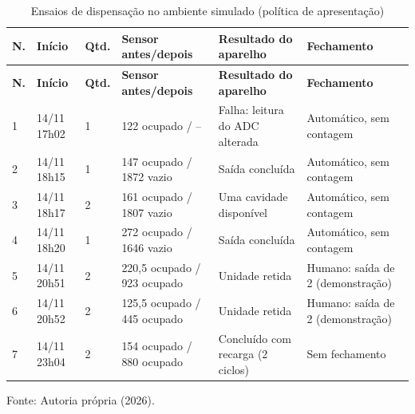 {\small\setlength{\tabcolsep}{3pt}\begin{longtable}{p{}p{}p{}p{}p{}p{}}
\caption{Ensaios de dispensação no ambiente simulado (política de apresentação)}\label{tab:ensaios-simulado}\\
\hline
\textbf{N.} & \textbf{Início} & \textbf{Qtd.} & \textbf{Sensor antes/depois} & \textbf{Resultado do aparelho} & \textbf{Fechamento}\\\hline
\endfirsthead\hline
\textbf{N.} & \textbf{Início} & \textbf{Qtd.} & \textbf{Sensor antes/depois} & \textbf{Resultado do aparelho} & \textbf{Fechamento}\\\hline
\endhead
1 & 14/11 17h02 & 1 & 122 ocupado / -- & Falha: leitura do ADC alterada & Automático, sem contagem\\\hline
2 & 14/11 18h15 & 1 & 147 ocupado / 1872 vazio & Saída concluída & Automático, sem contagem\\\hline
3 & 14/11 18h17 & 2 & 161 ocupado / 1807 vazio & Uma cavidade disponível & Automático, sem contagem\\\hline
4 & 14/11 18h20 & 1 & 272 ocupado / 1646 vazio & Saída concluída & Automático, sem contagem\\\hline
5 & 14/11 20h51 & 2 & 220,5 ocupado / 923 ocupado & Unidade retida & Humano: saída de 2 (demonstração)\\\hline
6 & 14/11 20h52 & 2 & 125,5 ocupado / 445 ocupado & Unidade retida & Humano: saída de 2 (demonstração)\\\hline
7 & 14/11 23h04 & 2 & 154 ocupado / 880 ocupado & Concluído com recarga (2 ciclos) & Sem fechamento\\\hline
\end{longtable}}{\small\noindent Fonte: Autoria própria (2026).\par}
